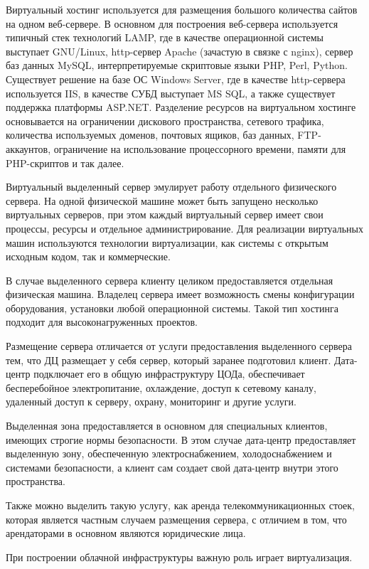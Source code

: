 Виртуальный хостинг используется для размещения большого количества сайтов на одном веб-сервере.
В основном для построения веб-сервера используется типичный стек технологий LAMP, где в качестве операционной системы выступает GNU/Linux, http-сервер Apache (зачастую в связке с nginx), сервер баз данных MySQL, интерпретируемые скриптовые языки PHP, Perl, Python.
Существует решение на базе ОС Windows Server, где в качестве http-сервера используется IIS, в качестве СУБД выступает MS SQL, а также существует поддержка платформы ASP.NET.
Разделение ресурсов на виртуальном хостинге основывается на ограничении дискового пространства, сетевого трафика, количества используемых доменов, почтовых ящиков, баз данных, FTP-аккаунтов, ограничение на использование процессорного времени, памяти для PHP-скриптов и так далее.

Виртуальный выделенный сервер эмулирует работу отдельного физического сервера.
На одной физической машине может быть запущено несколько виртуальных серверов, при этом каждый виртуальный сервер имеет свои процессы, ресурсы и отдельное администрирование.
Для реализации виртуальных машин используются технологии виртуализации, как системы с открытым исходным кодом, так и коммерческие.

В случае выделенного сервера клиенту целиком предоставляется отдельная физическая машина.
Владелец сервера имеет возможность смены конфигурации оборудования, установки любой операционной системы.
Такой тип хостинга подходит для высоконагруженных проектов.

Размещение сервера отличается от услуги предоставления выделенного сервера тем, что ДЦ размещает у себя сервер, который заранее подготовил клиент.
Дата-центр подключает его в общую инфраструктуру ЦОДа, обеспечивает бесперебойное электропитание, охлаждение, доступ к сетевому каналу, удаленный доступ к серверу, охрану, мониторинг и другие услуги.

Выделенная зона предоставляется в основном для специальных клиентов, имеющих строгие нормы безопасности.
В этом случае дата-центр предоставляет выделенную зону, обеспеченную электроснабжением, холодоснабжением и системами безопасности, а клиент сам создает свой дата-центр внутри этого пространства.

Также можно выделить такую услугу, как аренда телекоммуникационных стоек, которая является частным случаем размещения сервера, с отличием в том, что арендаторами в основном являются юридические лица.

При построении облачной инфраструктуры важную роль играет виртуализация.

